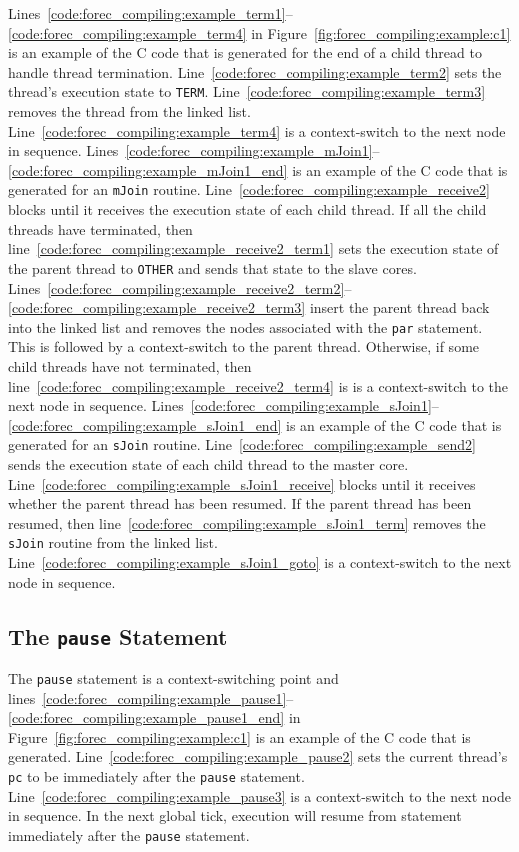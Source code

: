 Lines~\ref{code:forec_compiling:example_term1}--\ref{code:forec_compiling:example_term4} 
in Figure~\ref{fig:forec_compiling:example:c1} is an example 
of the C code that is generated for the end of a child 
thread to handle thread termination. 
Line~\ref{code:forec_compiling:example_term2} sets the thread's
execution state to \verb$TERM$. 
Line~\ref{code:forec_compiling:example_term3} removes the thread
from the linked list. 
Line~\ref{code:forec_compiling:example_term4} is a context-switch 
to the next node in sequence.
Lines~\ref{code:forec_compiling:example_mJoin1}--\ref{code:forec_compiling:example_mJoin1_end} 
is an example of the C code that is generated for an 
\verb$mJoin$ routine. 
Line~\ref{code:forec_compiling:example_receive2} blocks 
until it receives the execution state of each child thread.
If all the child threads have terminated, then 
line~\ref{code:forec_compiling:example_receive2_term1}
sets the execution state of the parent thread to \verb$OTHER$
and sends that state to the slave cores. 
Lines~\ref{code:forec_compiling:example_receive2_term2}--\ref{code:forec_compiling:example_receive2_term3}
insert the parent thread back into the linked list and 
removes the nodes associated with the \verb$par$ statement. 
This is followed by a context-switch to the parent thread.
Otherwise, if some child threads have not terminated, then
line~\ref{code:forec_compiling:example_receive2_term4} is 
is a context-switch to the next node in sequence.
Lines~\ref{code:forec_compiling:example_sJoin1}--\ref{code:forec_compiling:example_sJoin1_end}
is an example of the C code that is generated for an 
\verb$sJoin$ routine. 
Line~\ref{code:forec_compiling:example_send2} sends the 
execution state of each child thread to the master core.
Line~\ref{code:forec_compiling:example_sJoin1_receive}
blocks until it receives whether the parent thread has
been resumed. If the parent thread has been resumed, then
line~\ref{code:forec_compiling:example_sJoin1_term} removes
the \verb$sJoin$ routine from the linked list. 
Line~\ref{code:forec_compiling:example_sJoin1_goto} is a 
context-switch to the next node in sequence.


\subsection{The \texttt{pause} Statement}
The \verb$pause$ statement is a context-switching point and 
lines~\ref{code:forec_compiling:example_pause1}--\ref{code:forec_compiling:example_pause1_end} 
in Figure~\ref{fig:forec_compiling:example:c1}
is an example of the C code that is generated.
Line~\ref{code:forec_compiling:example_pause2} sets the
current thread's \verb$pc$ to be immediately after
the \verb$pause$ statement.
Line~\ref{code:forec_compiling:example_pause3} is a 
context-switch to the next node in sequence.
In the next global tick, execution will resume from statement 
immediately after the \verb$pause$ statement.


